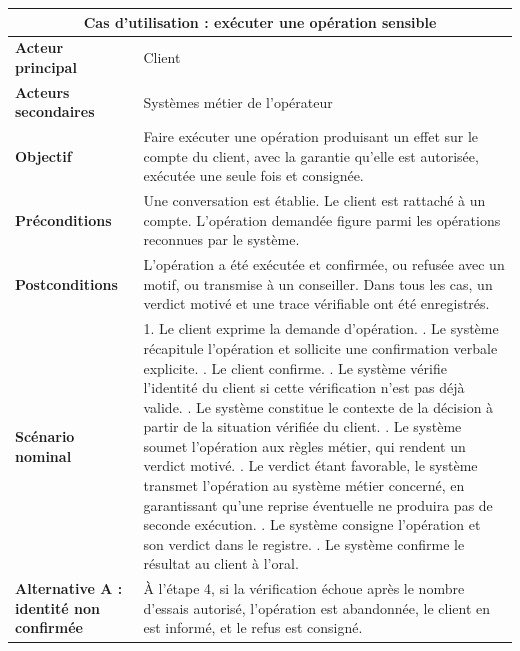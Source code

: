 \begin{table}[H]
\centering
\renewcommand{\arraystretch}{1.25}
\begin{tabular}{|p{3.0cm}|p{11.5cm}|}
\hline
\multicolumn{2}{|c|}{\textbf{Cas d'utilisation : exécuter une opération sensible}} \\
\hline
\textbf{Acteur principal} & Client \\
\hline
\textbf{Acteurs secondaires} & Systèmes métier de l'opérateur \\
\hline
\textbf{Objectif} & Faire exécuter une opération produisant un effet sur le compte du client, avec la garantie qu'elle est autorisée, exécutée une seule fois et consignée. \\
\hline
\textbf{Préconditions} & Une conversation est établie. Le client est rattaché à un compte. L'opération demandée figure parmi les opérations reconnues par le système. \\
\hline
\textbf{Postconditions} & L'opération a été exécutée et confirmée, ou refusée avec un motif, ou transmise à un conseiller. Dans tous les cas, un verdict motivé et une trace vérifiable ont été enregistrés. \\
\hline
\textbf{Scénario nominal} &
1. Le client exprime la demande d'opération. \newline
2. Le système récapitule l'opération et sollicite une confirmation verbale explicite. \newline
3. Le client confirme. \newline
4. Le système vérifie l'identité du client si cette vérification n'est pas déjà valide. \newline
5. Le système constitue le contexte de la décision à partir de la situation vérifiée du client. \newline
6. Le système soumet l'opération aux règles métier, qui rendent un verdict motivé. \newline
7. Le verdict étant favorable, le système transmet l'opération au système métier concerné, en garantissant qu'une reprise éventuelle ne produira pas de seconde exécution. \newline
8. Le système consigne l'opération et son verdict dans le registre. \newline
9. Le système confirme le résultat au client à l'oral. \\
\hline
\textbf{Alternative A : identité non confirmée} & À l'étape 4, si la vérification échoue après le nombre d'essais autorisé, l'opération est abandonnée, le client en est informé, et le refus est consigné. \\

\end{tabular}
\end{table}
